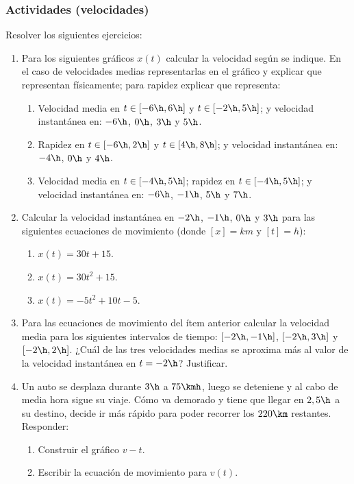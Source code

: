 \subsubsection*{Actividades (velocidades)}
\small
Resolver los siguientes ejercicios:
\begin{enumerate}
  \item Para los siguientes gráficos $x(t)$ calcular la velocidad según se
    indique. En el caso de velocidades medias representarlas en el gráfico y
    explicar que representan físicamente; para rapidez explicar que representa:
    \begin{enumerate}
      \item Velocidad media en $t\in [-6\h,6\h]$ y $t\in[-2\h,5\h]$; y velocidad
	instantánea en: $-6\h$, $0\h$, $3\h$ y $5\h$.
	
      \item Rapidez en $t\in[-6\h,2\h]$ y $t\in[4\h,8\h]$; y velocidad
	instantánea en: $-4\h$, $0\h$ y $4\h$.
	
      \item Velocidad media en $t\in[-4\h,5\h]$; rapidez en $t\in[-4\h,5\h]$; y
	velocidad instantánea en: $-6\h$, $-1\h$, $5\h$ y $7\h$.
	
    \end{enumerate}
  \item Calcular la velocidad instantánea en $-2\h$, $-1\h$, $0\h$ y $3\h$ para
    las siguientes ecuaciones de movimiento (donde $[x]=km$ y $[t]=h$):
    \begin{enumerate}
      \item $x(t)=30t+15$.
      \item $x(t)=30t^2+15$.
      \item $x(t)=-5t^2+10t-5$.
    \end{enumerate}
  \item Para las ecuaciones de movimiento del ítem anterior calcular la
    velocidad media para los siguientes intervalos de tiempo: $[-2\h,-1\h]$,
    $[-2\h,3\h]$ y $[-2\h,2\h]$. ¿Cuál de las tres velocidades medias se
    aproxima más al valor de la velocidad instantánea en $t=-2\h$? Justificar.
  \item Un auto se desplaza durante $3\h$ a $75\kmh$, luego se deteniene y al
  cabo de media hora sigue su viaje. Cómo va demorado y tiene que llegar en
  $2,5\h$ a su destino, decide ir más rápido para poder recorrer los $220\km$
  restantes.
  Responder:
  \begin{enumerate}
    \item Construir el gráfico $v-t$.
    \item Escribir la ecuación de movimiento para $v(t)$. 

\end{enumerate}
\end{enumerate}
